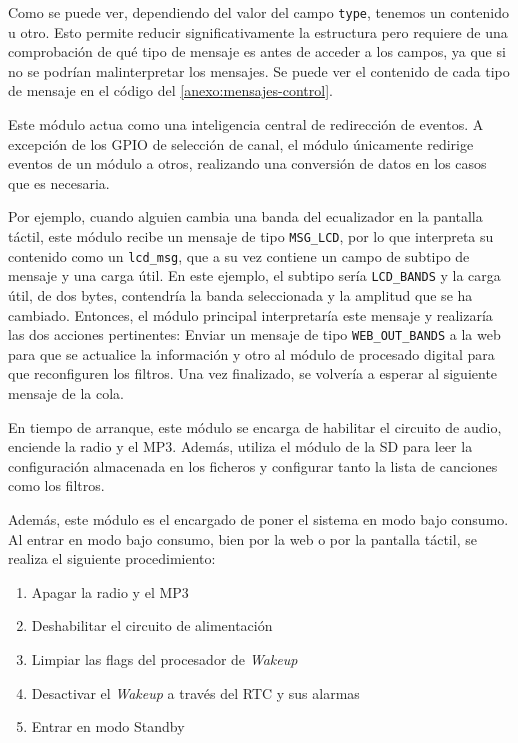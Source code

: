 Como se puede ver, dependiendo del valor del campo \texttt{type}, tenemos un contenido u otro. Esto permite reducir significativamente la estructura pero requiere de una comprobación de qué tipo de mensaje es antes de acceder a los campos, ya que si no se podrían malinterpretar los mensajes. Se puede ver el contenido de cada tipo de mensaje en el código del \autoref{anexo:mensajes-control}.

Este módulo actua como una inteligencia central de redirección de eventos. A excepción de los GPIO de selección de canal, el módulo únicamente redirige eventos de un módulo a otros, realizando una conversión de datos en los casos que es necesaria.

Por ejemplo, cuando alguien cambia una banda del ecualizador en la pantalla táctil, este módulo recibe un mensaje de tipo \texttt{MSG\_LCD}, por lo que interpreta su contenido como un \texttt{lcd\_msg}, que a su vez contiene un campo de subtipo de mensaje y una carga útil. En este ejemplo, el subtipo sería \texttt{LCD\_BANDS} y la carga útil, de dos bytes, contendría la banda seleccionada y la amplitud que se ha cambiado. Entonces, el módulo principal interpretaría este mensaje y realizaría las dos acciones pertinentes: Enviar un mensaje de tipo \texttt{WEB\_OUT\_BANDS} a la web para que se actualice la información y otro al módulo de procesado digital para que reconfiguren los filtros. Una vez finalizado, se volvería a esperar al siguiente mensaje de la cola.

En tiempo de arranque, este módulo se encarga de habilitar el circuito de audio, enciende la radio y el MP3. Además, utiliza el módulo de la SD para leer la configuración almacenada en los ficheros y configurar tanto la lista de canciones como los filtros.

Además, este módulo es el encargado de poner el sistema en modo bajo consumo. Al entrar en modo bajo consumo, bien por la web o por la pantalla táctil, se realiza el siguiente procedimiento:
\begin{enumerate}
    \item Apagar la radio y el MP3 
    \item Deshabilitar el circuito de alimentación
    \item Limpiar las flags del procesador de \textit{Wakeup}
    \item Desactivar el \textit{Wakeup} a través del RTC y sus alarmas
    \item Entrar en modo Standby
\end{enumerate}

